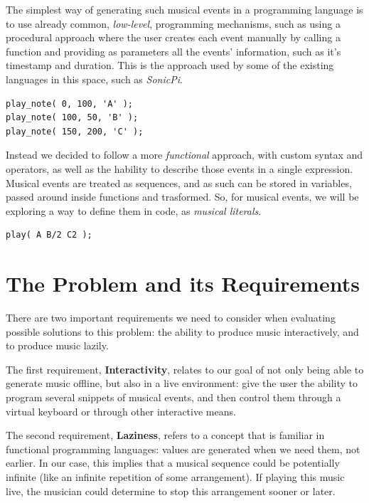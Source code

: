 \documentclass[a4paper,UKenglish,cleveref, autoref]{oasics-v2019}
\begin{document}
The simplest way of generating such musical events in a programming language is to use already common, \textit{low-level}, programming mechanisms, such as using a procedural approach where the user creates each event manually by calling a function and providing as parameters all the events' information, such as it's timestamp and duration. This is the approach used by some of the existing languages in this space, such as \textit{SonicPi}\cite{Aaron2014TemporalSF}.

\begin{lstlisting}[caption={Example of a hypothetical imperative API for creating events},label=list:1,captionpos=t,abovecaptionskip=-\medskipamount]
play_note( 0, 100, 'A' );
play_note( 100, 50, 'B' );
play_note( 150, 200, 'C' );
\end{lstlisting}

Instead we decided to follow a more \textit{functional} approach, with custom syntax and operators, as well as the hability to describe those events in a single expression. Musical events are treated as sequences, and as such can be stored in variables, passed around inside functions and trasformed. So, for musical events, we will be exploring a way to define them in code, as \textit{musical literals}.

\begin{lstlisting}[caption={Our proposed declarative syntax that calculates timings implicitly},label=list:2,captionpos=t,abovecaptionskip=-\medskipamount]
play( A B/2 C2 );
\end{lstlisting}

\section{The Problem and its Requirements}
There are two important requirements we need to consider when evaluating possible solutions to this problem: the ability to produce music interactively, and to produce music lazily.

The first requirement, \textbf{Interactivity}, relates to our goal of not only being able to generate music offline, but also in a live environment: give the user the ability to program several snippets of musical events, and then control them through a virtual keyboard or through other interactive means.

The second requirement, \textbf{Laziness}, refers to a concept that is familiar in functional programming languages: values are generated when we need them, not earlier. In our case, this implies that a musical sequence could be potentially infinite (like an infinite repetition of some arrangement). If playing this music live, the musician could determine to stop this arrangement sooner or later.
\end{document}
